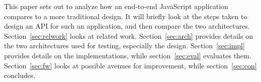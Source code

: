 This paper sets out to analyze how an end-to-end JavaScript application compares to a more traditional design. It will briefly look at the steps taken to design an API for such an application, and then compare the two architectures. Section~\ref{sec:relwork} looks at related work. Section~\ref{sec:arch} provides details on the two architectures used for testing, especially the design. Section~\ref{sec:impl} provides details on the implementations, while section~\ref{sec:eval} evaluates them. Section~\ref{sec:fw} looks at possible avenues for improvement, while section~\ref{sec:con} concludes.